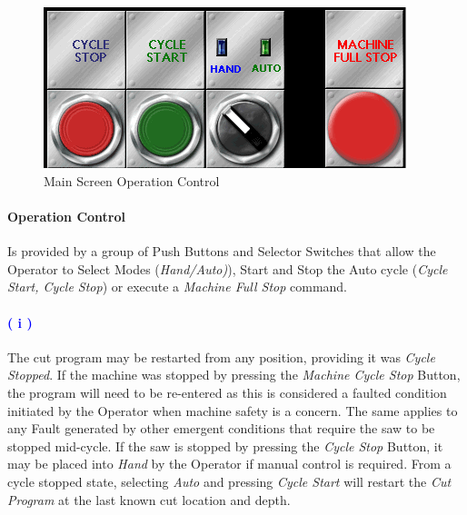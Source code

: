 \\
\\
\pagebreak
\begin{figure}
	\centering
	\includegraphics[width=.95\linewidth]{screen-captures/main-screen-opctl}
	\caption{Main Screen Operation Control}
	\label{fig:main-opctl}
\end{figure}
\paragraph{Operation Control} Is provided by a group of Push Buttons and Selector Switches that allow the Operator to Select Modes (\textit{Hand/Auto)}), Start and Stop the Auto cycle (\textit{Cycle Start, Cycle Stop}) or execute a \textit{Machine Full Stop} command. 
\paragraph{\textbf{\LARGE \textcolor{blue}{( i )}}} The cut program may be restarted from any position, providing it was \textit{Cycle Stopped}. If the machine was stopped by pressing the \textit{Machine Cycle Stop} Button, the program will need to be re-entered as this is considered a faulted condition initiated by the Operator when machine safety is a concern. The same applies to any Fault generated by other emergent conditions that require the saw to be stopped mid-cycle. If the saw is stopped by pressing the \textit{Cycle Stop} Button, it may be placed into \textit{Hand} by the Operator if manual control is required. From a cycle stopped state, selecting \textit{Auto} and pressing \textit{Cycle Start} will restart the \textit{Cut Program} at the last known cut location and depth.

